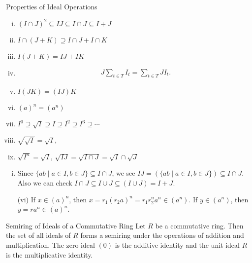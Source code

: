 \begin{proposition}{Properties of Ideal Operations}{}
    \begin{enumerate}[(i)]
        \item $(I\cap J)^2 \subseteq I J \subseteq I \cap J \subseteq I+J$
        \item ${I} \cap({J}+{K}) \supseteq {I} \cap {J}+{I} \cap {K}$
        \item ${I} ({J}+{K}) = {I}  {J}+{I}  {K}$
        \item $$
        \begin{gathered}
        J\sum_{t \in T} I_t=\sum_{t \in T} J I_t.
        \end{gathered}
        $$
        \item $I(J K)=(I J) K$
        \item $(a)^n=(a^n)$
        \item $I^0 \supseteq \sqrt{I} \supseteq I \supseteq I^2 \supseteq I^3 \supseteq \cdots$
        \item $\sqrt{\sqrt{I}} = \sqrt{I}$,
        \item $\sqrt{I^n}=\sqrt{I}$, $\sqrt{I J}=\sqrt{I \cap J}=\sqrt{I} \cap \sqrt{J}$
    \end{enumerate}
\end{proposition}

\begin{prf}
    \begin{enumerate}[(i)]
        \item Since $\{ab\mid a\in I,b\in J\}\subseteq I\cap J$, we see $IJ=\left(\{ab\mid a\in I,b\in J\}\right)\subseteq I\cap J$. Also we can check $I \cap J \subseteq I \cup J\subseteq (I \cup J)=I+J$.
        \item[(vi)] If $x\in(a)^n$, then $x=r_1(r_2a)^n=r_1r_2^na^n\in(a^n)$. If $y\in(a^n)$, then $y=ra^n\in(a)^n$.
    \end{enumerate}
\end{prf}

\begin{definition}{Semiring of Ideals of a Commutative Ring}{}
    Let $R$ be a commutative ring. Then the set of all ideals of $R$ forms a semiring under the operations of addition and multiplication. The zero ideal $(0)$ is the additive identity and the unit ideal $R$ is the multiplicative identity. 
\end{definition}

